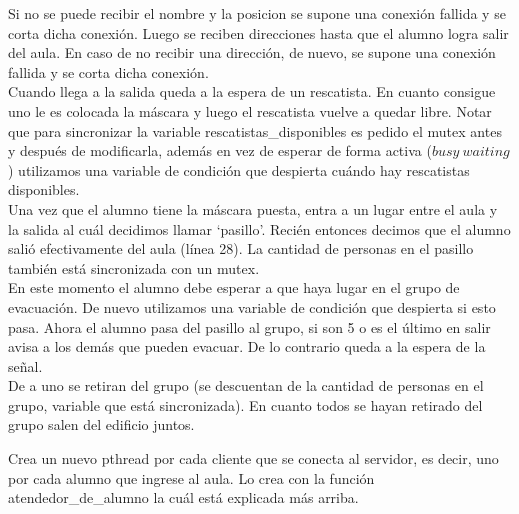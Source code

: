 \begin{algorithmic}[1]
     \Else
     \EndIf
   
   \Statex
 \EndProcedure
\end{algorithmic} 
\smallskip
Si no se puede recibir el nombre y la posicion se supone una conexión fallida y se corta dicha conexión.
Luego se reciben direcciones hasta que el alumno logra salir del aula. En caso de no recibir una dirección, 
de nuevo, se supone una conexión fallida y se corta dicha conexión. \\

Cuando llega a la salida queda a la espera de un rescatista. En cuanto consigue uno le es colocada la máscara y luego
el rescatista vuelve a quedar libre. Notar que para sincronizar la variable rescatistas\_disponibles 
es pedido el mutex antes y después de modificarla, además en vez de esperar de forma activa ($busy\ waiting$)
utilizamos una variable de condición que despierta cuándo hay rescatistas disponibles.\\

Una vez que el alumno tiene la máscara puesta, entra a un lugar entre el aula y la salida al cuál decidimos llamar 
\textquoteleft pasillo\textquoteright. Recién entonces decimos que el alumno salió efectivamente del aula (línea 28).
La cantidad de personas en el pasillo también está sincronizada con un mutex.\\

En este momento el alumno debe esperar a que haya lugar en el grupo de evacuación. De nuevo utilizamos una variable
de condición que despierta si esto pasa. Ahora el alumno pasa del pasillo al grupo, si son 5 o es el último en salir
avisa a los demás que pueden evacuar. De lo contrario queda a la espera de la señal.\\
De a uno se retiran del grupo (se descuentan de la cantidad de personas en el grupo, variable que está sincronizada).
En cuanto todos se hayan retirado del grupo salen del edificio juntos.
\bigskip

\begin{algorithmic}[1] 
     \EndIf
   \EndFor
 \EndFunction
\end{algorithmic}
\smallskip
Crea un nuevo pthread por cada cliente que se conecta al servidor, es decir, uno por cada alumno que ingrese al aula.
Lo crea con la función atendedor\_de\_alumno la cuál está explicada más arriba.